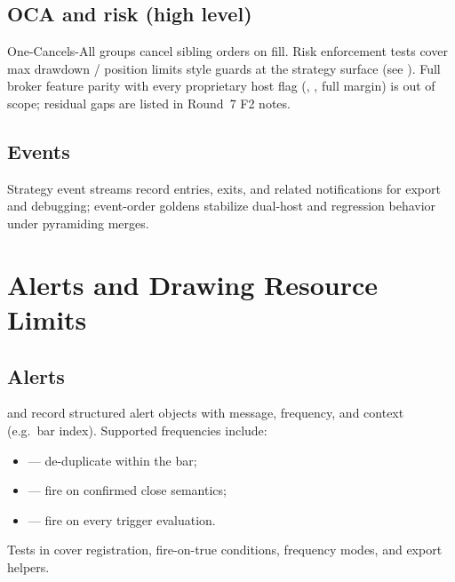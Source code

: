 \documentclass[11pt,a4paper]{article}
\begin{document}
\subsection{OCA and risk (high level)}
One-Cancels-All groups cancel sibling orders on fill.
Risk enforcement tests cover max drawdown / position limits style guards at
the strategy surface (see ).
Full broker feature parity with every proprietary host flag
(, , full margin)
is out of scope; residual gaps are listed in Round~7 F2 notes.

\subsection{Events}
Strategy event streams record entries, exits, and related notifications for
export and debugging; event-order goldens stabilize dual-host and regression
behavior under pyramiding merges.

\section{Alerts and Drawing Resource Limits}
\label{sec:alerts}

\subsection{Alerts}
 and  record structured alert objects
with message, frequency, and context (e.g.\ bar index).
Supported frequencies include:
\begin{itemize}[leftmargin=*]
  \item {} --- de-duplicate within the bar;
  \item {} --- fire on confirmed close semantics;
  \item {} --- fire on every trigger evaluation.
\end{itemize}
Tests in  cover registration, fire-on-true
conditions, frequency modes, and export helpers.
\end{document}
